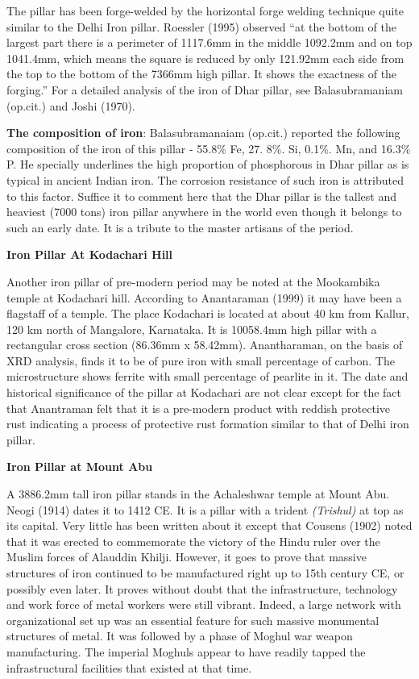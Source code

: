 The pillar has been forge-welded by the horizontal forge welding technique quite similar to the Delhi Iron pillar. Roessler (1995) observed ``at the bottom of the largest part there is a perimeter of 1117.6mm in the middle 1092.2mm and on top 1041.4mm, which means the square is reduced by only 121.92mm each side from the top to the bottom of the 7366mm high pillar. It shows the exactness of the forging.'' For a detailed analysis of the iron of Dhar pillar, see Balasubramaniam (op.cit.) and Joshi (1970).

\textbf{The composition of iron}: Balasubramanaiam (op.cit.) reported the following composition of the iron of this pillar - 55.8\% Fe, 27. 8\%. Si, 0.1\%. Mn, and 16.3\% P. He specially underlines the high proportion of phosphorous in Dhar pillar as is typical in ancient Indian iron. The corrosion resistance of such iron is attributed to this factor. Suffice it to comment here that the Dhar pillar is the tallest and heaviest (7000 tons) iron pillar anywhere in the world even though it belongs to such an early date. It is a tribute to the master artisans of the period.

\textbf{Iron Pillar At Kodachari Hill}

Another iron pillar of pre-modern period may be noted at the Mookambika temple at Kodachari hill. According to Anantaraman (1999) it may have been a flagstaff of a temple. The place Kodachari is located at about 40 km from Kallur, 120 km north of Mangalore, Karnataka. It is 10058.4mm high pillar with a rectangular cross section (86.36mm x 58.42mm). Anantharaman, on the basis of XRD analysis, finds it to be of pure iron with small percentage of carbon. The microstructure shows ferrite with small percentage of pearlite in it. The date and historical significance of the pillar at Kodachari are not clear except for the fact that Anantraman felt that it is a pre-modern product with reddish protective rust indicating a process of protective rust formation similar to that of Delhi iron pillar.

\textbf{Iron Pillar at Mount Abu}

A 3886.2mm tall iron pillar stands in the Achaleshwar temple at Mount Abu. Neogi (1914) dates it to 1412 CE. It is a pillar with a trident \textit{(Trishul)} at top as its capital. Very little has been written about it except that Cousens (1902) noted that it was erected to commemorate the victory of the Hindu ruler over the Muslim forces of Alauddin Khilji. However, it goes to prove that massive structures of iron continued to be manufactured right up to 15th century CE, or possibly even later. It proves without doubt that the infrastructure, technology and work force of metal workers were still vibrant. Indeed, a large network with organizational set up was an essential feature for such massive monumental structures of metal. It was followed by a phase of Moghul war weapon manufacturing. The imperial Moghuls appear to have readily tapped the infrastructural facilities that existed at that time.

